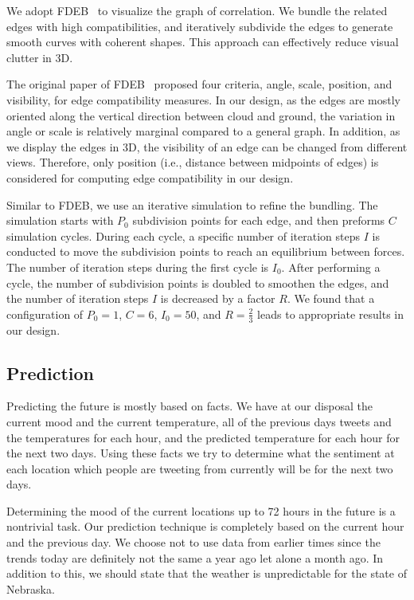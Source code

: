 \documentclass[journal]{vgtc}                %
\begin{document}
We adopt FDEB~\cite{holten2009force} to visualize the graph of correlation. We bundle the related edges with high compatibilities, and iteratively subdivide the edges to generate smooth curves with coherent shapes. This approach can effectively reduce visual clutter in 3D.

The original paper of FDEB~\cite{holten2009force} proposed four criteria, angle, scale, position, and visibility, for edge compatibility measures. In our design, as the edges are mostly oriented along the vertical direction between cloud and ground, the variation in angle or scale is relatively marginal compared to a general graph. In addition, as we display the edges in 3D, the visibility of an edge can be changed from different views. Therefore, only position (i.e., distance between midpoints of edges) is considered for computing edge compatibility in our design.

Similar to FDEB, we use an iterative simulation to refine the bundling. The simulation starts with $P_0$ subdivision points for each edge, and then preforms $C$ simulation cycles. During each cycle, a specific number of iteration steps $I$ is conducted to move the subdivision points to reach an equilibrium between forces. The number of iteration steps during the first cycle is $I_0$. After performing a cycle, the number of subdivision points is doubled to smoothen the edges, and the number of iteration steps $I$ is decreased by a factor $R$. We found that a configuration of $P_0=1$, $C=6$, $I_0=50$, and $R=\frac{2}{3}$ leads to appropriate results in our design. 


\subsection{Prediction}
Predicting the future is mostly based on facts. We have at our disposal the current mood and the current temperature, all of the previous days tweets and the temperatures for each hour, and the predicted temperature for each hour for the next two days. Using these facts we try to determine what the sentiment at each location which people are tweeting from currently will be for the next two days. 

Determining the mood of the current locations up to 72 hours in the future is a nontrivial task. Our prediction technique is completely based on the current hour and the previous day. We choose not to use data from earlier times since the trends today are definitely not the same a year ago let alone a month ago. In addition to this, we should state that the weather is unpredictable for the state of Nebraska.
\end{document}
